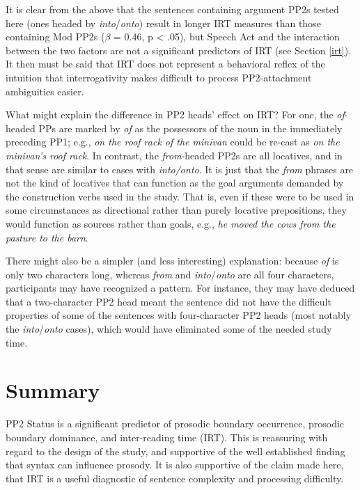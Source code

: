 \documentclass[11pt,oneside]{book}
\begin{document}
It is clear from the above that the sentences containing argument PP2s tested here (ones headed by \emph{into}/\emph{onto}) result in longer IRT measures than those containing Mod PP2s (\(\beta\) = 0.46, p \textless{} .05), but Speech Act and the interaction between the two factors are not a significant predictors of IRT (see Section \ref{irt}). It then must be said that IRT does not represent a behavioral reflex of the intuition that interrogativity makes difficult to process PP2-attachment ambiguities easier.

What might explain the difference in PP2 heads' effect on IRT? For one, the \emph{of}-headed PPs are marked by \emph{of} as the possessors of the noun in the immediately preceding PP1; e.g., \emph{on the roof rack of the minivan} could be re-cast as \emph{on the minivan's roof rack}. In contrast, the \emph{from}-headed PP2s are all locatives, and in that sense are similar to cases with \emph{into/onto}. It is just that the \emph{from} phrases are not the kind of locatives that can function as the goal arguments demanded by the construction verbs used in the study. That is, even if these were to be used in some circumstances as directional rather than purely locative prepositions, they would function as sources rather than goals, e.g., \emph{he moved the cows from the pasture to the barn}.

There might also be a simpler (and less interesting) explanation: because \emph{of} is only two characters long, whereas \emph{from} and \emph{into}/\emph{onto} are all four characters, participants may have recognized a pattern. For instance, they may have deduced that a two-character PP2 head meant the sentence did not have the difficult properties of some of the sentences with four-character PP2 heads (most notably the \emph{into}/\emph{onto} cases), which would have eliminated some of the needed study time.

\hypertarget{summary}{%
\section{Summary}\label{summary}}

PP2 Status is a significant predictor of prosodic boundary occurrence, prosodic boundary dominance, and inter-reading time (IRT). This is reassuring with regard to the design of the study, and supportive of the well established finding that syntax can influence prosody. It is also supportive of the claim made here, that IRT is a useful diagnostic of sentence complexity and processing difficulty.
\end{document}
